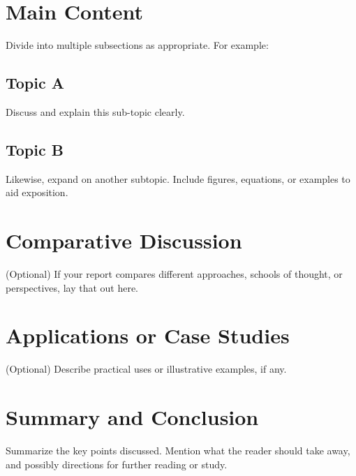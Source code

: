 \documentclass[12pt]{article}
\begin{document}
\section{Main Content}
Divide into multiple subsections as appropriate. For example:
\subsection{Topic A}
Discuss and explain this sub-topic clearly.

\subsection{Topic B}
Likewise, expand on another subtopic. Include figures, equations, or examples to aid exposition.

\section{Comparative Discussion}
(Optional) If your report compares different approaches, schools of thought, or perspectives, lay that out here.

\section{Applications or Case Studies}
(Optional) Describe practical uses or illustrative examples, if any.

\section{Summary and Conclusion}
Summarize the key points discussed. Mention what the reader should take away, and possibly directions for further reading or study.


\end{document}
